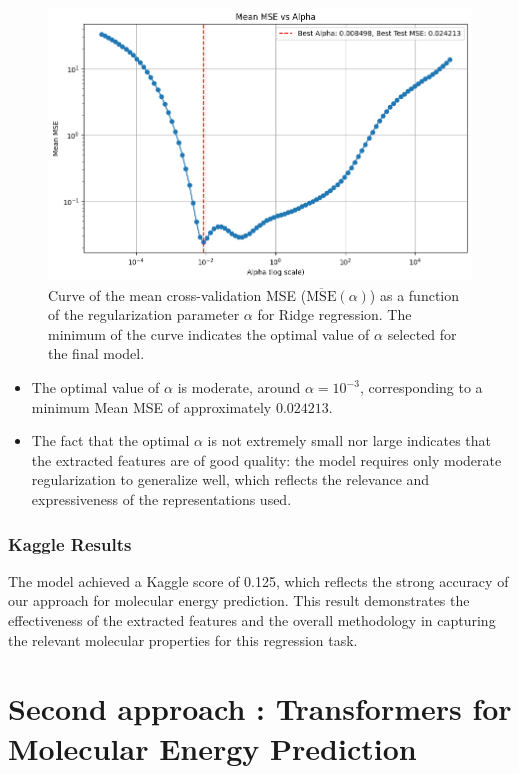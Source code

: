 \documentclass{article}
\begin{document}
\begin{figure}[H]
  \centering
  \includegraphics[width=0.8\linewidth]{Images_Ayoub/Training/Scattering/CV/Losses/Loss.png}
  \caption{Curve of the mean cross-validation MSE (\(\overline{\text{MSE}}(\alpha)\)) as a function of the regularization parameter \(\alpha\) for Ridge regression. The minimum of the curve indicates the optimal value of \(\alpha\) selected for the final model.}
  \label{fig:cv_mse_vs_alpha}
\end{figure}
\begin{itemize}
  \item The optimal value of \(\alpha\) is moderate, around \(\alpha = 10^{-3}\), corresponding to a minimum Mean MSE of approximately \(0.024213\).
  \item The fact that the optimal \(\alpha\) is not extremely small nor large indicates that the extracted features are of good quality: the model requires only moderate regularization to generalize well, which reflects the relevance and expressiveness of the representations used.
\end{itemize}


\subsubsection{Kaggle Results}

The model achieved a Kaggle score of 0.125, which reflects the strong accuracy of our approach for molecular energy prediction. This result demonstrates the effectiveness of the extracted features and the overall methodology in capturing the relevant molecular properties for this regression task.
\section{Second approach : Transformers for Molecular Energy Prediction}
\end{document}

